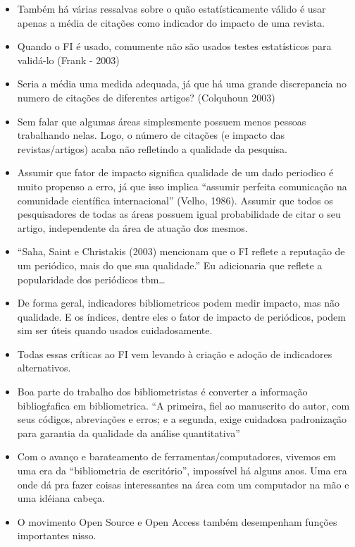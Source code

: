 \documentclass[11pt]{article}
\begin{document}
\begin{itemize}
\item Também há várias ressalvas sobre o quão estatísticamente válido é usar apenas a média de citações como indicador do impacto de uma revista.

\item Quando o FI é usado, comumente não são usados testes estatísticos para validá-lo (Frank - 2003)

\item Seria a média uma medida adequada, já que há uma grande discrepancia no numero de citações de diferentes artigos? (Colquhoun 2003)

\item Sem falar que algumas áreas simplesmente possuem menos pessoas trabalhando nelas. Logo, o número de citações (e impacto das revistas/artigos) acaba não refletindo a qualidade da pesquisa.

\item Assumir que fator de impacto significa qualidade de um dado periodico é muito propenso a erro, já que isso implica ``assumir perfeita comunicação na comunidade científica internacional'' (Velho, 1986). Assumir que todos os pesquisadores de todas as áreas possuem igual probabilidade de citar o seu artigo, independente da área de atuação dos mesmos.

\item ``Saha, Saint e Christakis (2003) mencionam que o FI reflete a reputação de um periódico, mais do que sua qualidade.'' Eu adicionaria que reflete a popularidade dos periódicos tbm\ldots{}

\item De forma geral, indicadores bibliometricos podem medir impacto, mas não qualidade. E os índices, dentre eles o fator de impacto de periódicos, podem sim ser úteis quando usados cuidadosamente.

\item Todas essas críticas ao FI vem levando à criação e adoção de indicadores alternativos.

\item Boa parte do trabalho dos bibliometristas é converter a informação bibliogŕafica em bibliometrica. ``A primeira, fiel ao manuscrito do autor, com seus códigos, abreviações e erros; e a segunda, exige cuidadosa padronização para garantia da qualidade da análise quantitativa''

\item Com o avanço e barateamento de ferramentas/computadores, vivemos em uma era da ``bibliometria de escritório'', impossível há alguns anos. Uma era onde dá pra fazer coisas interessantes na área com um computador na mão e uma idéiana cabeça.

\item O movimento Open Source e Open Access também desempenham funções importantes nisso.
\end{itemize}
\end{document}
